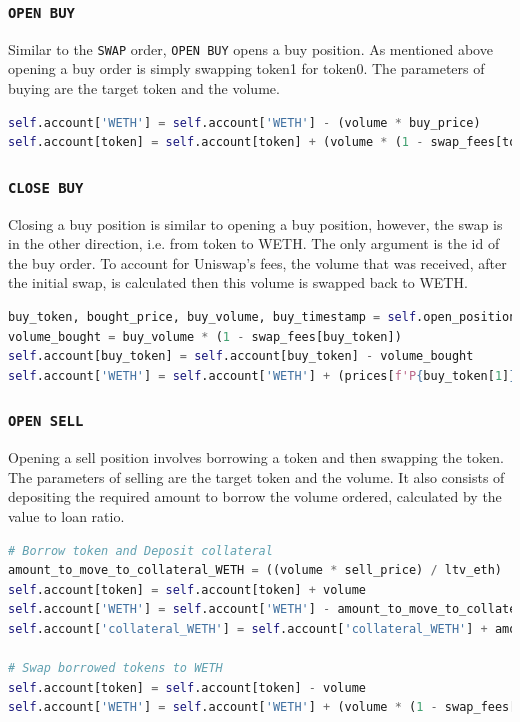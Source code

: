 \subsubsection{\texttt{OPEN\ BUY}}
Similar to the \texttt{SWAP} order, \texttt{OPEN\ BUY} opens a buy position. As mentioned above opening a buy order is simply swapping token1 for token0. The parameters of buying are the target token and the volume. 
\vspace{5mm}
\begin{lstlisting}[language=Python]
self.account['WETH'] = self.account['WETH'] - (volume * buy_price)
self.account[token] = self.account[token] + (volume * (1 - swap_fees[token]))
\end{lstlisting}

\subsubsection{\texttt{CLOSE\ BUY}}
Closing a buy position is similar to opening a buy position, however, the swap is in the other direction, i.e. from token to WETH. The only argument is the id of the buy order. To account for Uniswap's fees, the volume that was received, after the initial swap, is calculated then this volume is swapped back to WETH.
\vspace{5mm}
\begin{lstlisting}[language=Python]
buy_token, bought_price, buy_volume, buy_timestamp = self.open_positions['BUY'][buy_id]
volume_bought = buy_volume * (1 - swap_fees[buy_token])
self.account[buy_token] = self.account[buy_token] - volume_bought
self.account['WETH'] = self.account['WETH'] + (prices[f'P{buy_token[1]}'] * (volume_bought * (1 - swap_fees[buy_token])))
\end{lstlisting}

\subsubsection{\texttt{OPEN\ SELL}}
Opening a sell position involves borrowing a token and then swapping the token. The parameters of selling are the target token and the volume. It also consists of depositing the required amount to borrow the volume ordered, calculated by the value to loan ratio.
\vspace{5mm}
\begin{lstlisting}[language=Python]
# Borrow token and Deposit collateral
amount_to_move_to_collateral_WETH = ((volume * sell_price) / ltv_eth)
self.account[token] = self.account[token] + volume
self.account['WETH'] = self.account['WETH'] - amount_to_move_to_collateral_WETH
self.account['collateral_WETH'] = self.account['collateral_WETH'] + amount_to_move_to_collateral_WETH

# Swap borrowed tokens to WETH
self.account[token] = self.account[token] - volume
self.account['WETH'] = self.account['WETH'] + (volume * (1 - swap_fees[token]) * sell_price)
\end{lstlisting}

